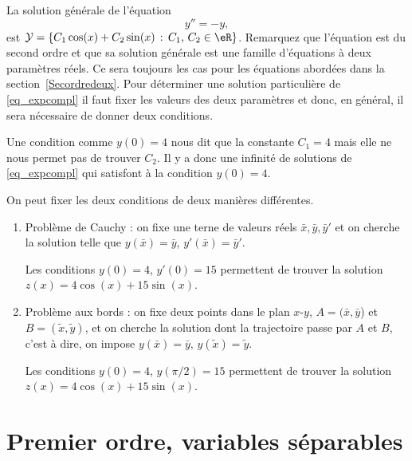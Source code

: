 \begin{example}
	La solution générale de l'équation
	\begin{equation}\label{eq_expcompl}
		y'' = -y,
	\end{equation}
	est \(\mathcal{Y}= \{C_1\cos(x) + C_2\sin(x) \, :\, C_1,\, C_2\in\eR\}\). Remarquez que l'équation est du second ordre et que sa solution générale est une famille d'équations \`a deux paramètres réels. Ce sera toujours les cas pour les équations abordées dans la section~\ref{Secordredeux}.
	Pour déterminer une solution particulière de \eqref{eq_expcompl} il faut fixer les valeurs des deux paramètres et donc, en général, il sera nécessaire de donner deux conditions.
\end{example}

\begin{remark}
	Une condition comme \(y(0)=4\) nous dit que la constante \( C_1 = 4\) mais elle ne nous permet pas de trouver \( C_2\). Il y a donc une infinité de solutions de \eqref{eq_expcompl} qui satisfont \`a la condition \(y(0)=4\).
\end{remark}

On peut fixer les deux conditions de deux manières différentes.
\begin{enumerate}
	\item{Problème  de Cauchy :} on fixe une terne de valeurs réels \(\bar x, \bar y, \bar y'\) et on cherche la solution telle que \(y(\bar x) = \bar y\), \(y'(\bar x) = \bar y'\).

	\begin{example}
		Les conditions \(y(0)=4\), \(y'(0)=15\) permettent de trouver la solution \(z(x) = 4\cos(x) + 15\sin(x)\).
	\end{example}
	\item{Problème aux bords :} on fixe deux points dans le plan \( x\)-\( y\), \(A=(\bar x, \bar y\)) et \(B=(\tilde x, \tilde y)\), et on cherche la solution dont la trajectoire passe par \( A\) et \( B\), c'est \`a dire, on impose \(y(\bar x) = \bar y\), \(y(\tilde x) = \tilde y\).

	\begin{example}
		Les conditions \(y(0)=4\), \(y(\pi/2)=15\) permettent de trouver la solution \(z(x) = 4\cos(x) + 15\sin(x)\).
	\end{example}
\end{enumerate}

\section{Premier ordre, variables séparables}

